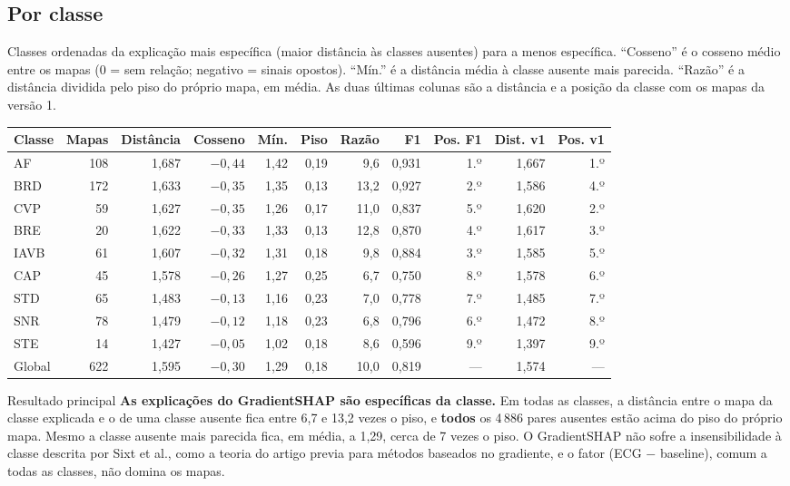 \documentclass[11pt,a4paper]{article}
\begin{document}
\subsection{Por classe}
Classes ordenadas da explicação mais específica (maior distância às classes ausentes) para a menos específica. “Cosseno” é o cosseno médio entre os mapas (0 = sem relação; negativo = sinais opostos). “Mín.” é a distância média à classe ausente mais parecida. “Razão” é a distância dividida pelo piso do próprio mapa, em média. As duas últimas colunas são a distância e a posição da classe com os mapas da versão 1.
\begin{center}\small
\setlength{\tabcolsep}{4pt}
\begin{tabular}{lrrrrrrrrrr}
\toprule
\textbf{Classe} & \textbf{Mapas} & \textbf{Distância} & \textbf{Cosseno} & \textbf{Mín.} & \textbf{Piso} & \textbf{Razão} & \textbf{F1} & \textbf{Pos. F1} & \textbf{Dist. v1} & \textbf{Pos. v1} \\
\midrule
AF   & 108 & 1,687 & $-0{,}44$ & 1,42 & 0,19 &  9,6 & 0,931 & 1.º & 1,667 & 1.º \\
BRD  & 172 & 1,633 & $-0{,}35$ & 1,35 & 0,13 & 13,2 & 0,927 & 2.º & 1,586 & 4.º \\
CVP  &  59 & 1,627 & $-0{,}35$ & 1,26 & 0,17 & 11,0 & 0,837 & 5.º & 1,620 & 2.º \\
BRE  &  20 & 1,622 & $-0{,}33$ & 1,33 & 0,13 & 12,8 & 0,870 & 4.º & 1,617 & 3.º \\
IAVB &  61 & 1,607 & $-0{,}32$ & 1,31 & 0,18 &  9,8 & 0,884 & 3.º & 1,585 & 5.º \\
CAP  &  45 & 1,578 & $-0{,}26$ & 1,27 & 0,25 &  6,7 & 0,750 & 8.º & 1,578 & 6.º \\
STD  &  65 & 1,483 & $-0{,}13$ & 1,16 & 0,23 &  7,0 & 0,778 & 7.º & 1,485 & 7.º \\
SNR  &  78 & 1,479 & $-0{,}12$ & 1,18 & 0,23 &  6,8 & 0,796 & 6.º & 1,472 & 8.º \\
STE  &  14 & 1,427 & $-0{,}05$ & 1,02 & 0,18 &  8,6 & 0,596 & 9.º & 1,397 & 9.º \\
\midrule
Global & 622 & 1,595 & $-0{,}30$ & 1,29 & 0,18 & 10,0 & 0,819 & --- & 1,574 & --- \\
\bottomrule
\end{tabular}
\end{center}

\begin{infobox}[ok]{Resultado principal}
\textbf{As explicações do GradientSHAP são específicas da classe.} Em todas as classes, a distância entre o mapa da classe explicada e o de uma classe ausente fica entre 6,7 e 13,2 vezes o piso, e \textbf{todos} os 4\,886 pares ausentes estão acima do piso do próprio mapa. Mesmo a classe ausente mais parecida fica, em média, a 1,29, cerca de 7 vezes o piso. O GradientSHAP não sofre a insensibilidade à classe descrita por Sixt et al., como a teoria do artigo previa para métodos baseados no gradiente, e o fator (ECG $-$ baseline), comum a todas as classes, não domina os mapas.
\end{infobox}
\end{document}
